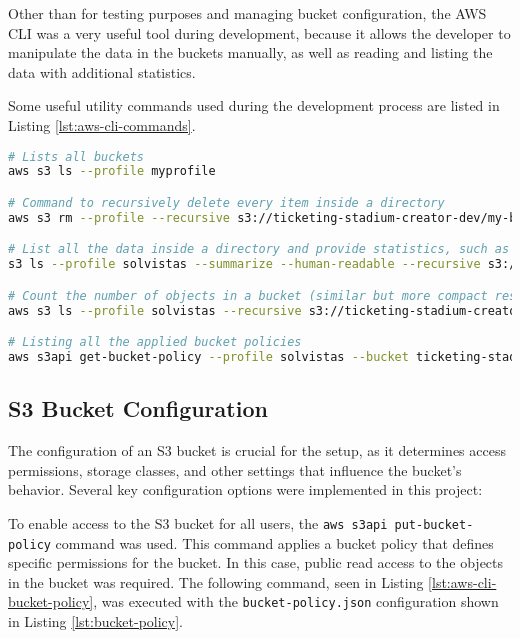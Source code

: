 Other than for testing purposes and managing bucket configuration, the AWS CLI was a very useful tool during development, because it allows the developer to manipulate the data in the buckets manually, as well as reading and listing the data with additional statistics.

Some useful utility commands used during the development process are listed in Listing \ref{lst:aws-cli-commands}.

\begin{lstlisting}[language=bash, caption={Useful AWS CLI Commands}, label={lst:aws-cli-commands}]
# Lists all buckets
aws s3 ls --profile myprofile

# Command to recursively delete every item inside a directory
aws s3 rm --profile --recursive s3://ticketing-stadium-creator-dev/my-bucket/

# List all the data inside a directory and provide statistics, such as file size, object count, and total file size
s3 ls --profile solvistas --summarize --human-readable --recursive s3://ticketing-stadium-creator-dev/my-bucket

# Count the number of objects in a bucket (similar but more compact results than in the previous command)
aws s3 ls --profile solvistas --recursive s3://ticketing-stadium-creator-dev/ | wc -l

# Listing all the applied bucket policies
aws s3api get-bucket-policy --profile solvistas --bucket ticketing-stadium-creator-dev

\end{lstlisting}

\subsection{S3 Bucket Configuration}
The configuration of an S3 bucket is crucial for the setup, as it determines access permissions, storage classes, and other settings that influence the bucket’s behavior. Several key configuration options were implemented in this project:

To enable access to the S3 bucket for all users, the \texttt{aws s3api put-bucket-policy} command was used. This command applies a bucket policy that defines specific permissions for the bucket. In this case, public read access to the objects in the bucket was required. The following command, seen in Listing \ref{lst:aws-cli-bucket-policy}, was executed with the \texttt{bucket-policy.json} configuration shown in Listing \ref{lst:bucket-policy}.

